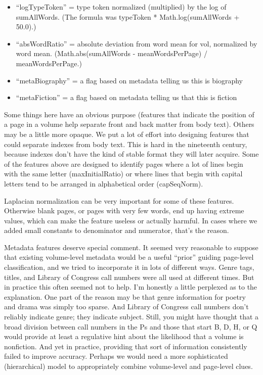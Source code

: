 \documentclass[paper=a4, fontsize=12pt]{scrartcl}
\numberwithin{equation}{section}		%
\numberwithin{figure}{section}			%
\numberwithin{table}{section}				%
\begin{document}
\begin{itemize}
\item  ``logTypeToken'' = type token normalized (multiplied) by the log of sumAllWords. (The formula was typeToken * Math.log(sumAllWords + 50.0).)
\item  ``absWordRatio'' = absolute deviation from word mean for vol, normalized by word mean. (Math.abs(sumAllWords - meanWordsPerPage) / meanWordsPerPage.)
\item  ``metaBiography'' = a flag based on metadata telling us this is biography
\item  ``metaFiction'' = a flag based on metadata telling us that this is fiction
\end{itemize}

Some things here have an obvious purpose (features that indicate the position of a page in a volume help separate front and back matter from body text). Others may be a little more opaque. We put a lot of effort into designing features that could separate indexes from body text. This is hard in the nineteenth century, because indexes don't have the kind of stable format they will later acquire. Some of the features above are designed to identify pages where a lot of lines begin with the same letter (maxInitialRatio) or where lines that begin with capital letters tend to be arranged in alphabetical order (capSeqNorm).

Laplacian normalization can be very important for some of these features. Otherwise blank pages, or pages with very few words, end up having extreme values, which can make the feature useless or actually harmful. In cases where we added small constants to denominator and numerator, that's the reason.

Metadata features deserve special comment. It seemed very reasonable to suppose that existing volume-level metadata would be a useful ``prior'' guiding page-level classification, and we tried to incorporate it in lots of different ways. Genre tags, titles, and Library of Congress call numbers were all used at different times. But in practice this often seemed not to help. I'm honestly a little perplexed as to the explanation. One part of the reason may be that genre information for poetry and drama was simply too sparse. And Library of Congress call numbers don't reliably indicate genre; they indicate subject. Still, you might have thought that a broad division between call numbers in the Ps and those that start B, D, H, or Q would provide at least a regulative hint about the likelihood that a volume is nonfiction. And yet in practice, providing that sort of information consistently failed to improve accuracy. Perhaps we would need a more sophisticated (hierarchical) model to appropriately combine volume-level and page-level clues.
\end{document}
